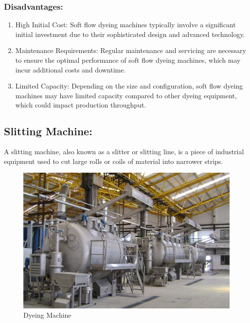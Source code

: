 \subsubsection{Disadvantages:}

\begin{enumerate}
\item
  High Initial Cost: Soft flow dyeing machines typically involve a
  significant initial investment due to their sophisticated design and
  advanced technology.
\item
  Maintenance Requirements: Regular maintenance and servicing are
  necessary to ensure the optimal performance of soft flow dyeing
  machines, which may incur additional costs and downtime.
\item
  Limited Capacity: Depending on the size and configuration, soft flow
  dyeing machines may have limited capacity compared to other dyeing
  equipment, which could impact production throughput.
\end{enumerate}

\subsection{Slitting Machine:}


A slitting machine, also known as a slitter or slitting line, is a piece
of industrial equipment used to cut large rolls or coils of material
into narrower strips.

\begin{figure}[h!]
  \centering
  \includegraphics[width=0.7\linewidth]{figs/production/image1.png}
  \caption{Dyeing Machine}
  \label{fig:Dyeing Machine}
\end{figure}

